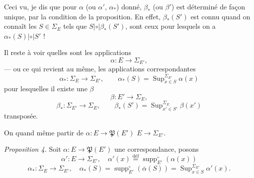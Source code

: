 \documentclass[11pt,a4paper]{article}
\begin{document}
Ceci vu, je dis que  pour $\alpha$ (ou $\alpha'$, $\alpha_{*}$) donné, $\beta_{*}$ (ou $\beta'$) est déterminé de façon unique, par la condition de la proposition. En effet, $\beta_{*}(S')$ est connu quand on connaît les $S \in \Sigma_E$ tels que $S \mathrel{|\circ|} \beta_{*}(S')$,  sont ceux pour lesquels on a $\alpha_{*}(S) \mathrel{|\circ|} S'$ !

Il reste à voir quelles sont les applications
\[
  \alpha : E \longrightarrow \Sigma_{E'} ,
\]
--- ou ce qui revient au même, les applications correspondantes
\[
  \alpha_{*} : \Sigma_E \to \Sigma_{E'} , \qquad \alpha_{*}(S) = \operatorname{Sup}^{\Sigma_{E'}}_{x \in S} \alpha(x)
\]
pour lesquelles il existe une $\beta$
\[
  \beta : E' \longrightarrow \Sigma_E ,
\]
 \uncertain{\ill{}}
\[
  \beta_{*} : \Sigma_{E'} \to \Sigma_E , \qquad \beta_{*}(S') = \operatorname{Sup}^{\Sigma_E}_{x' \in S'} \beta(x')
\]
transposée.

On  quand même partir de $\alpha : E \to \mathfrak{P}(E')$  $E \to \Sigma_{E'}$.



\emph{Proposition 4.} Soit $\alpha : E \to \mathfrak{P}(E')$ une correspondance,  posons
\[
  \alpha' : E \to \Sigma_{E'} , \quad \alpha'(x) \overset{\text{déf}}{=} \operatorname{supp}^{\circ}_{E'}(\alpha(x))
\]
\[
  \alpha_{*} : \Sigma_E \to \Sigma_{E'} , \quad
  \alpha_{*}(S) = \operatorname{supp}^{\circ}_{E'}(\overline{\alpha}(S)) = \operatorname{Sup}^{\Sigma_{E'}}_{x \in S} \alpha'(x) .
\]
\end{document}
